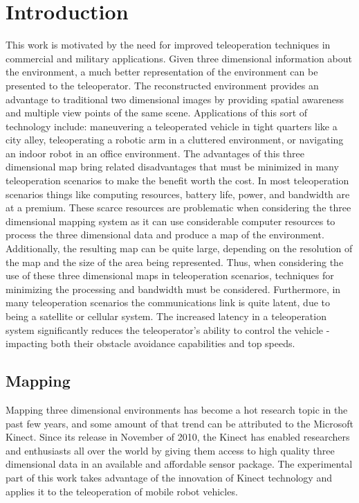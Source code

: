 \documentclass[12pt]{report}
\begin{document}
\normalem       %


\chapter{Introduction}\label{chap:introduction}
This work is motivated by the need for improved teleoperation techniques in commercial and military applications.  Given three dimensional information about the environment, a much better representation of the environment can be presented to the teleoperator.  The reconstructed environment provides an advantage to traditional two dimensional images by providing spatial awareness and multiple view points of the same scene.  Applications of this sort of technology include: maneuvering a teleoperated vehicle in tight quarters like a city alley, teleoperating a robotic arm in a cluttered environment, or navigating an indoor robot in an office environment.  The advantages of this three dimensional map bring related disadvantages that must be minimized in many teleoperation scenarios to make the benefit worth the cost.  In most teleoperation scenarios things like computing resources, battery life, power, and bandwidth are at a premium.  These scarce resources are problematic when considering the three dimensional mapping system as it can use considerable computer resources to process the three dimensional data and produce a map of the environment.  Additionally, the resulting map can be quite large, depending on the resolution of the map and the size of the area being represented.  Thus, when considering the use of these three dimensional maps in teleoperation scenarios, techniques for minimizing the processing and bandwidth must be considered.  Furthermore, in many teleoperation scenarios the communications link is quite latent, due to being a satellite or cellular system.  The increased latency in a teleoperation system significantly reduces the teleoperator's ability to control the vehicle - impacting both their obstacle avoidance capabilities and top speeds\cite{photo_real}.

\section{Mapping}
Mapping three dimensional environments has become a hot research topic in the past few years, and some amount of that trend can be attributed to the Microsoft Kinect\cite{KINECT}.  Since its release in November of 2010\cite{GIZMODO}, the Kinect has enabled researchers and enthusiasts all over the world by giving them access to high quality three dimensional data in an available and affordable sensor package.  The experimental part of this work takes advantage of the innovation of Kinect technology and applies it to the teleoperation of mobile robot vehicles.
\end{document}

